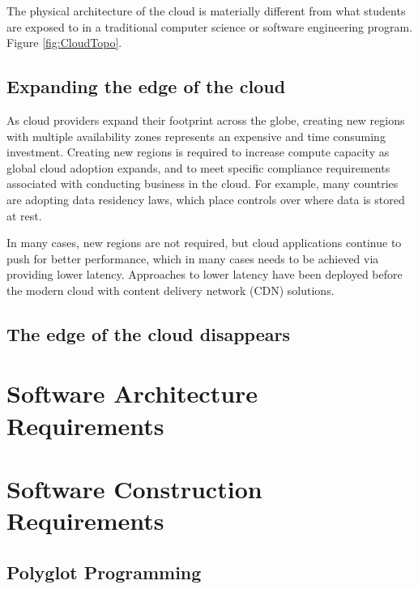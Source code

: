\documentclass[conference]{IEEEconf}
\begin{document}
The physical architecture of the cloud is materially different from what students are exposed to in a traditional computer science or software engineering program.  Figure \ref{fig:CloudTopo}.

\subsection{Expanding the edge of the cloud}
As cloud providers expand their footprint across the globe, creating new regions with multiple availability zones represents an expensive and time consuming investment. Creating new regions is required to increase compute capacity as global cloud adoption expands, and to meet specific compliance requirements associated with conducting business in the cloud. For example, many countries are adopting data residency laws, which place controls over where data is stored at rest. 

In many cases, new regions are not required, but cloud applications continue to push for better performance, which in many cases needs to be achieved via providing lower latency.  Approaches to lower latency have been deployed before the modern cloud with content delivery network (CDN)\cite{CDN} solutions. 

\subsection{The edge of the cloud disappears}

\section{Software Architecture Requirements}
\label{sec:SoftwareArchitecture}

\section{Software Construction Requirements}
\label{sec:SoftwareConstruction}

\subsection{Polyglot Programming}
\label{subsec:Polyglot}




\end{document}
